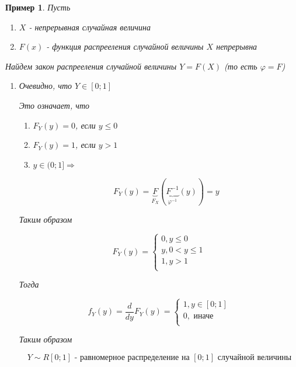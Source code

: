 \documentclass[a4paper, 14pt]{report}
\newtheorem{example}{Пример}[section]
\begin{document}
\begin{example}
    Пусть

    \begin{enumerate}
        \item $X$ - непрерывная случайная величина
        \item $F(x)$ - функция распрееления случайной величины $X$ непрерывна
    \end{enumerate}

    Найдем закон распрееления случайной величины $Y=F(X)$ (то есть $\varphi = F$)

    \begin{enumerate}
        \item Очевидно, что $Y \in [0;1]$

        Это означает, что

        \begin{enumerate}
            \item $F_Y(y) = 0$, если $y \le 0$
            \item $F_Y(y) = 1$, если $y > 1$
            \item $y \in (0;1] \Rightarrow$

                $$
                F_Y(y) = \underbrace{F}_{F_X} (\underbrace{F^{-1}}_{\varphi^{-1}}(y)) = y
                $$
        \end{enumerate}

        Таким образом

        $$
        F_Y(y) =
        \begin{cases}
            0, y \le 0 \\
            y, 0 < y \le 1 \\
            1, y > 1 \\
        \end{cases}
        $$

        Тогда

        $$
        f_Y(y) = \frac{d}{dy} F_Y(y) =
        \begin{cases}
            1, y \in [0;1] \\
            0, \text{ иначе} \\
        \end{cases}
        $$

        Таким образом

        $$
        Y \sim R[0;1] \text{ - равномерное распределение на } [0;1] \text{ случайной величины}
        $$
    \end{enumerate}
\end{example}
\end{document}
